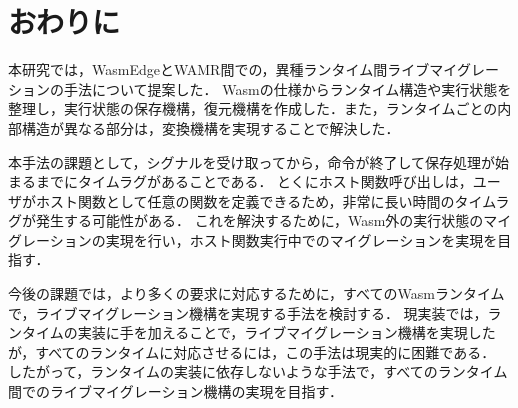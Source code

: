 \chapter{おわりに}
本研究では，WasmEdgeとWAMR間での，異種ランタイム間ライブマイグレーションの手法について提案した．
Wasmの仕様からランタイム構造や実行状態を整理し，実行状態の保存機構，復元機構を作成した．また，ランタイムごとの内部構造が異なる部分は，変換機構を実現することで解決した．

本手法の課題として，シグナルを受け取ってから，命令が終了して保存処理が始まるまでにタイムラグがあることである．
とくにホスト関数呼び出しは，ユーザがホスト関数として任意の関数を定義できるため，非常に長い時間のタイムラグが発生する可能性がある．
これを解決するために，Wasm外の実行状態のマイグレーションの実現を行い，ホスト関数実行中でのマイグレーションを実現を目指す．

今後の課題では，より多くの要求に対応するために，すべてのWasmランタイムで，ライブマイグレーション機構を実現する手法を検討する．
現実装では，ランタイムの実装に手を加えることで，ライブマイグレーション機構を実現したが，すべてのランタイムに対応させるには，この手法は現実的に困難である．
したがって，ランタイムの実装に依存しないような手法で，すべてのランタイム間でのライブマイグレーション機構の実現を目指す．